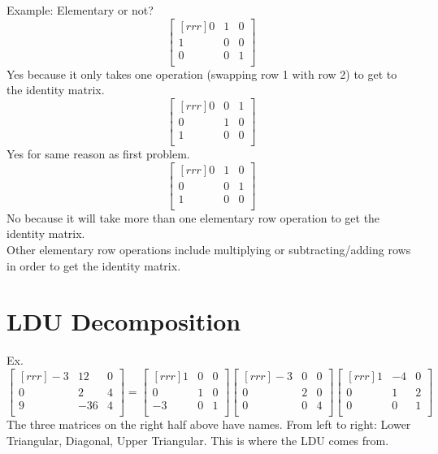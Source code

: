 \documentclass{report}
\begin{document}
Example: Elementary or not?\\
\[
\begin{bmatrix}[rrr] 0 & 1 & 0\\ 1 & 0 & 0\\ 0 & 0 & 1\\ \end{bmatrix}
\]
Yes because it only takes one operation (swapping row 1 with row 2) to get to the identity matrix.
\[
\begin{bmatrix}[rrr] 0 & 0 & 1\\ 0 & 1 & 0\\ 1 & 0 & 0\\ \end{bmatrix}
\]
Yes for same reason as first problem.
\[ 
\begin{bmatrix}[rrr] 0 & 1 & 0\\ 0 & 0 & 1\\ 1 & 0 & 0\\ \end{bmatrix}
\]
No because it will take more than one elementary row operation to get the identity matrix.\\
Other elementary row operations include multiplying or subtracting/adding rows in order to get the identity matrix.\\
\section{LDU Decomposition}

Ex.\\
\[
\begin{bmatrix}[rrr]
-3 & 12 & 0\\
0 & 2 & 4\\
9 & -36 & 4\\
\end{bmatrix}
=
\begin{bmatrix}[rrr]
1 & 0 & 0\\
0 & 1 & 0\\
-3 & 0 & 1\\
\end{bmatrix}
\begin{bmatrix}[rrr]
-3 & 0 & 0\\
0 & 2 & 0\\
0 & 0 & 4\\
\end{bmatrix}
\begin{bmatrix}[rrr]
1 & -4 & 0\\
0 & 1 & 2\\
0 & 0 & 1\\
\end{bmatrix}
\]
The three matrices on the right half above have names. From left to right: Lower Triangular, Diagonal, Upper Triangular. This is where the LDU comes from.\\
\end{document}
